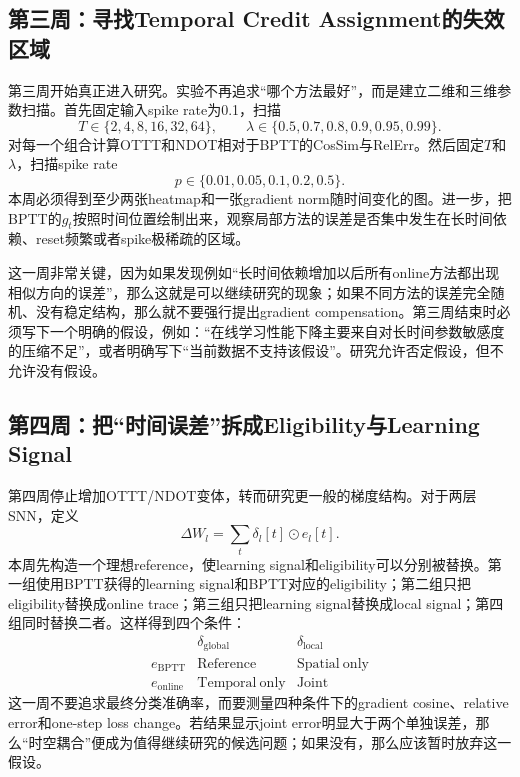\documentclass[journal,12pt,onecolumn]{IEEEtran}
\begin{document}
\subsection{第三周：寻找Temporal Credit Assignment的失效区域}

第三周开始真正进入研究。实验不再追求“哪个方法最好”，而是建立二维和三维参数扫描。首先固定输入spike rate为0.1，扫描
\begin{equation}
T\in\{2,4,8,16,32,64\},
\qquad
\lambda\in\{0.5,0.7,0.8,0.9,0.95,0.99\}.
\end{equation}
对每一个组合计算OTTT和NDOT相对于BPTT的CosSim与RelErr。然后固定$T$和$\lambda$，扫描spike rate
\begin{equation}
p\in\{0.01,0.05,0.1,0.2,0.5\}.
\end{equation}
本周必须得到至少两张heatmap和一张gradient norm随时间变化的图。进一步，把BPTT的$g_t$按照时间位置绘制出来，观察局部方法的误差是否集中发生在长时间依赖、reset频繁或者spike极稀疏的区域。

这一周非常关键，因为如果发现例如“长时间依赖增加以后所有online方法都出现相似方向的误差”，那么这就是可以继续研究的现象；如果不同方法的误差完全随机、没有稳定结构，那么就不要强行提出gradient compensation。第三周结束时必须写下一个明确的假设，例如：“在线学习性能下降主要来自对长时间参数敏感度的压缩不足”，或者明确写下“当前数据不支持该假设”。研究允许否定假设，但不允许没有假设。

\subsection{第四周：把“时间误差”拆成Eligibility与Learning Signal}

第四周停止增加OTTT/NDOT变体，转而研究更一般的梯度结构。对于两层SNN，定义
\begin{equation}
\Delta W_l
=
\sum_t
\delta_l[t]\odot e_l[t].
\end{equation}
本周先构造一个理想reference，使learning signal和eligibility可以分别被替换。第一组使用BPTT获得的learning signal和BPTT对应的eligibility；第二组只把eligibility替换成online trace；第三组只把learning signal替换成local signal；第四组同时替换二者。这样得到四个条件：
\begin{equation}
\begin{array}{c|cc}
 & \delta_{\mathrm{global}} & \delta_{\mathrm{local}}\\
\hline
e_{\mathrm{BPTT}} & \mathrm{Reference} & \mathrm{Spatial\ only}\\
e_{\mathrm{online}} & \mathrm{Temporal\ only} & \mathrm{Joint}
\end{array}
\end{equation}
这一周不要追求最终分类准确率，而要测量四种条件下的gradient cosine、relative error和one-step loss change。若结果显示joint error明显大于两个单独误差，那么“时空耦合”便成为值得继续研究的候选问题；如果没有，那么应该暂时放弃这一假设。
\end{document}
